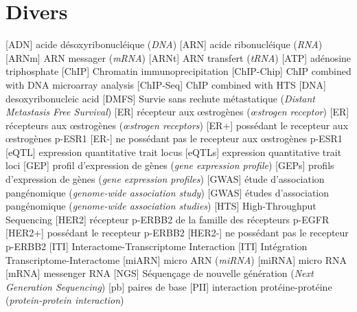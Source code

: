 	\section*{\textcolor{mygrey}{Divers}}
		\begin{acronym}[CDKN2A]
						[ADN]		{acide désoxyribonucléique (\emph{\acs{DNA}})}
						[ARN]		{acide ribonucléique (\emph{\acs{RNA}})}
						[ARNm]		{\acs{ARN} messager (\emph{\acs{mRNA}})}
						[ARNt]		{\acs{ARN} transfert (\emph{\acs{tRNA}})}
						[ATP]		{adénosine triphosphate}
						[ChIP]		{Chromatin immunoprecipitation}
				{\acs{ChIP} combined with DNA microarray analysis}
					[ChIP-Seq]	{\acs{ChIP} combined with \acs{HTS}}
						[DNA]		{desoxyribonucleic acid}
						[DMFS]		{Survie sans rechute métastatique (\emph{Distant Metastasis Free Survival})}
						[ER]		{récepteur aux {\oe}strogènes (\emph{{\oe}strogen receptor})}
					{récepteurs aux {\oe}strogènes (\emph{{\oe}strogen receptors})}
						[ER+]		{possédant le recepteur aux {\oe}strogènes \acs{p-ESR1}}
						[ER-]		{ne possédant pas le recepteur aux {\oe}strogènes \acs{p-ESR1}}
						[eQTL]		{expression quantitative trait locus}
						[eQTLs]		{expression quantitative trait loci}
						[GEP]		{profil d'expression de gènes (\emph{gene expression profile})}
					{profils d'expression de gènes (\emph{gene expression profiles})}
						[GWAS]		{étude d'association pangénomique (\emph{genome-wide association study})}
					{études d'association pangénomique (\emph{genome-wide association studies})}
						[HTS]		{High-Throughput Sequencing}
						[HER2]		{récepteur \acs{p-ERBB2} de la famille des récepteurs \acs{p-EGFR}}
						[HER2+]		{possédant le recepteur \acs{p-ERBB2}}
						[HER2-]		{ne possédant pas le recepteur \acs{p-ERBB2}}
						[ITI]		{Interactome-Transcriptome Interaction}
						[ITI]		{Intégration Transcriptome-Interactome}
						[miARN]		{micro \acs{ARN} (\emph{\ac{miRNA}})}
						[miRNA]		{micro \acs{RNA}}
						[mRNA]		{messenger \ac{RNA}}
						[NGS]		{Séquençage de nouvelle génération (\emph{Next Generation Sequencing})}
						[pb]		{paires de base}
						[PII]		{interaction protéine-protéine (\emph{protein-protein interaction})}

\end{acronym}
